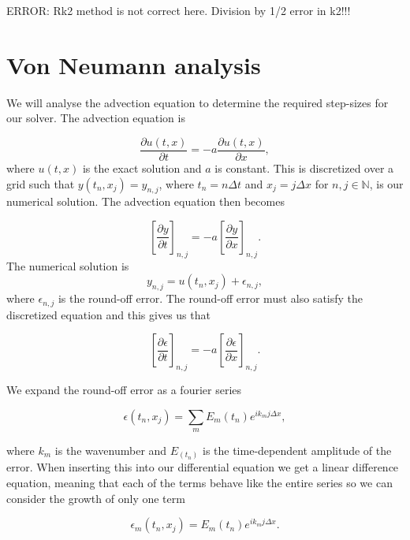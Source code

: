 \documentclass{article}
\begin{document}
ERROR: Rk2 method is not correct here. Division by 1/2 error in k2!!!

\section{Von Neumann analysis}

We will analyse the advection equation to determine the required step-sizes for our solver. The advection equation is

\begin{equation}
    \frac{\partial u(t,x)}{\partial t} = -a \frac{\partial u(t,x)}{\partial x},
\end{equation}
where $u(t,x)$ is the exact solution and $a$ is constant. This is discretized over a grid such that $y(t_n,x_j)=y_{n,j}$, where $t_n = n\Delta t$ and $x_j = j\Delta x$ for $n,j\in\mathbb{N}$, is our numerical solution. The advection equation then becomes

\begin{equation}
    \left[\frac{\partial y}{\partial t}\right]_{n,j} = -a \left[\frac{\partial y}{\partial x}\right]_{n,j}.
\end{equation}
The numerical solution is
\begin{equation}
    y_{n,j} = u(t_n,x_j)+\epsilon_{n,j},
\end{equation}
where $\epsilon_{n,j}$ is the round-off error. The round-off error must also satisfy the discretized equation and this gives us that

\begin{equation}\label{eq:advection_error}
    \left[\frac{\partial \epsilon}{\partial t}\right]_{n,j} = -a \left[\frac{\partial \epsilon}{\partial x}\right]_{n,j}.
\end{equation}

We expand the round-off error as a fourier series

\begin{equation}
    \epsilon(t_n,x_j) = \sum_m E_m(t_n) e^{i k_m j\Delta x},
\end{equation}

where $k_m$ is the wavenumber and $E_(t_n)$ is the time-dependent amplitude of the error. When inserting this into our differential equation we get a linear difference equation, meaning that each of the terms behave like the entire series so we can consider the growth of only one term

\begin{equation}
    \epsilon_m(t_n,x_j) = E_m(t_n) e^{i k_m j\Delta x}.
\end{equation}
\end{document}
